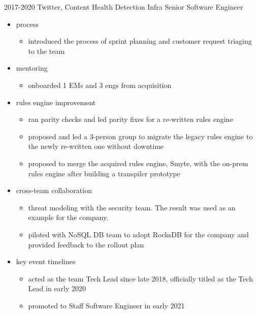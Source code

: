 \documentclass[]{friggeri-cv-a4}
\begin{document}
\begin{entrylist}
  \entry
      {2017-2020}
      {Twitter, Content Health Detection Infra}
      {Senior Software Engineer}
      {
        \begin{itemize}
        \item process
          \begin{itemize}
          \item introduced the process of sprint planning and customer request triaging to the team
          \end{itemize}
        \item mentoring
          \begin{itemize}
          \item onboarded 1 EMs and 3 engs from acquisition
          \end{itemize}
        \item rules engine improvement
          \begin{itemize}
          \item ran parity checks and led parity fixes for a re-written rules engine
          \item proposed and led a 3-person group to migrate the legacy rules engine to the newly re-written one without downtime
          \item proposed to merge the acquired rules engine, Smyte, with the on-prem rules engine after building a transpiler prototype
          \end{itemize}
        \item cross-team collaboration
          \begin{itemize}
          \item threat modeling with the security team. The result  was used as an example for the company.
          \item piloted with NoSQL DB team to adopt RocksDB for the company and provided feedback to the rollout plan
          \end{itemize}
        \item key event timelines
          \begin{itemize}
          \item acted as the team Tech Lead since late 2018, officially titled as the Tech Lead in early 2020
          \item promoted to Staff Software Engineer in early 2021
          \end{itemize}
        \end{itemize}
      }
\end{entrylist}
\end{document}
